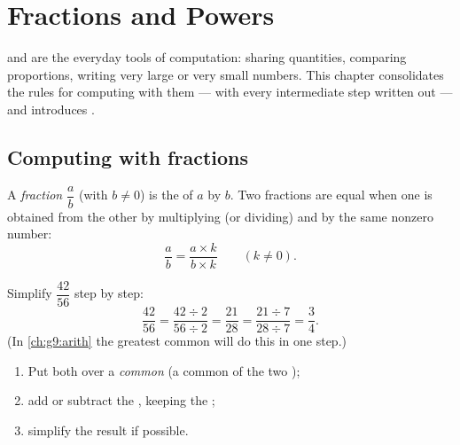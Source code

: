 \chapter{Fractions and Powers}\label{ch:g9:fractions}

 and  are the everyday tools of computation: sharing
quantities, comparing proportions, writing very large or very small
numbers. This chapter consolidates the rules for computing with them ---
with every intermediate step written out --- and introduces .

\section{Computing with fractions}

\begin{definition}[Fraction]\label{def:g9:fractions:fraction}
A \emph{fraction} $\dfrac ab$ (with $b \neq 0$) is the
 of $a$ by $b$. Two fractions are equal when one is obtained from
the other by multiplying (or dividing)  and  by the
same nonzero number:
\[
\frac ab = \frac{a \times k}{b \times k} \qquad (k \neq 0).
\]
\end{definition}

\begin{example}\label{ex:g9:fractions:simplify}
Simplify $\dfrac{42}{56}$ step by step:
\[
\frac{42}{56} = \frac{42 \div 2}{56 \div 2} = \frac{21}{28}
= \frac{21 \div 7}{28 \div 7} = \frac34 .
\]
(In \cref{ch:g9:arith} the greatest common  will do this in one
step.)
\end{example}

\begin{method}\label{met:g9:fractions:add}
\begin{enumerate}
  \item Put both  over a \emph{common } (a common
         of the two );
  \item add or subtract the , keeping the ;
  \item simplify the result if possible.
\end{enumerate}
\end{method}

